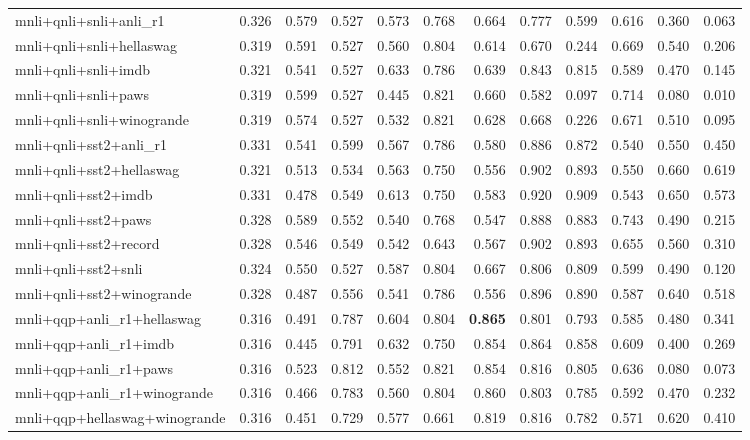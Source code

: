 \begin{table}[t]
\begin{tabular}{lrrrrrrrrrrr}
    mnli+qnli+snli+anli\_r1 & 0.326 & 0.579 & 0.527 & 0.573 & 0.768 & 0.664 & 0.777 & 0.599 & 0.616 & 0.360 & 0.063 \\
    mnli+qnli+snli+hellaswag & 0.319 & 0.591 & 0.527 & 0.560 & 0.804 & 0.614 & 0.670 & 0.244 & 0.669 & 0.540 & 0.206 \\
    mnli+qnli+snli+imdb & 0.321 & 0.541 & 0.527 & 0.633 & 0.786 & 0.639 & 0.843 & 0.815 & 0.589 & 0.470 & 0.145 \\
    mnli+qnli+snli+paws & 0.319 & 0.599 & 0.527 & 0.445 & 0.821 & 0.660 & 0.582 & 0.097 & 0.714 & 0.080 & 0.010 \\
    mnli+qnli+snli+winogrande & 0.319 & 0.574 & 0.527 & 0.532 & 0.821 & 0.628 & 0.668 & 0.226 & 0.671 & 0.510 & 0.095 \\
    mnli+qnli+sst2+anli\_r1 & 0.331 & 0.541 & 0.599 & 0.567 & 0.786 & 0.580 & 0.886 & 0.872 & 0.540 & 0.550 & 0.450 \\
    mnli+qnli+sst2+hellaswag & 0.321 & 0.513 & 0.534 & 0.563 & 0.750 & 0.556 & 0.902 & 0.893 & 0.550 & 0.660 & 0.619 \\
    mnli+qnli+sst2+imdb & 0.331 & 0.478 & 0.549 & 0.613 & 0.750 & 0.583 & 0.920 & 0.909 & 0.543 & 0.650 & 0.573 \\
    mnli+qnli+sst2+paws & 0.328 & 0.589 & 0.552 & 0.540 & 0.768 & 0.547 & 0.888 & 0.883 & 0.743 & 0.490 & 0.215 \\
    mnli+qnli+sst2+record & 0.328 & 0.546 & 0.549 & 0.542 & 0.643 & 0.567 & 0.902 & 0.893 & 0.655 & 0.560 & 0.310 \\
    mnli+qnli+sst2+snli & 0.324 & 0.550 & 0.527 & 0.587 & 0.804 & 0.667 & 0.806 & 0.809 & 0.599 & 0.490 & 0.120 \\
    mnli+qnli+sst2+winogrande & 0.328 & 0.487 & 0.556 & 0.541 & 0.786 & 0.556 & 0.896 & 0.890 & 0.587 & 0.640 & 0.518 \\
    mnli+qqp+anli\_r1+hellaswag & 0.316 & 0.491 & 0.787 & 0.604 & 0.804 & \textbf{0.865} & 0.801 & 0.793 & 0.585 & 0.480 & 0.341 \\
    mnli+qqp+anli\_r1+imdb & 0.316 & 0.445 & 0.791 & 0.632 & 0.750 & 0.854 & 0.864 & 0.858 & 0.609 & 0.400 & 0.269 \\
    mnli+qqp+anli\_r1+paws & 0.316 & 0.523 & 0.812 & 0.552 & 0.821 & 0.854 & 0.816 & 0.805 & 0.636 & 0.080 & 0.073 \\
    mnli+qqp+anli\_r1+winogrande & 0.316 & 0.466 & 0.783 & 0.560 & 0.804 & 0.860 & 0.803 & 0.785 & 0.592 & 0.470 & 0.232 \\
    mnli+qqp+hellaswag+winogrande & 0.316 & 0.451 & 0.729 & 0.577 & 0.661 & 0.819 & 0.816 & 0.782 & 0.571 & 0.620 & 0.410 \\

\end{tabular}
\end{table}

